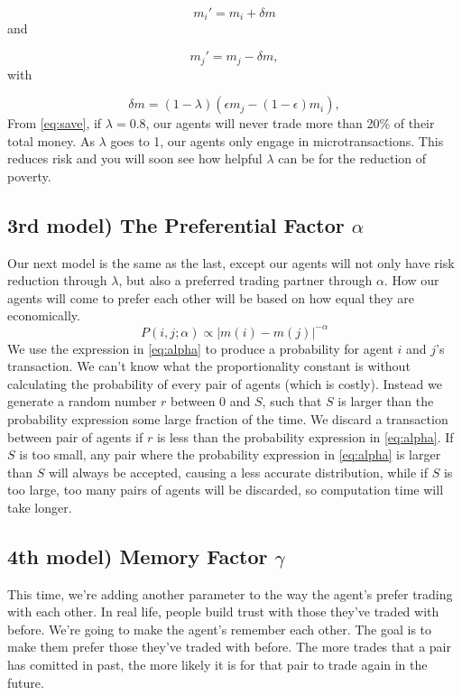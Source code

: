 \documentclass[12pt,a4paper]{article}
\begin{document}
\begin{equation}
  m_i'=m_i+\delta m
\end{equation}
and

\begin{equation}
  m_j'=m_j-\delta m,
\end{equation}
with

\begin{equation}\label{eq:save}
  \delta m=(1-\lambda)(\epsilon m_j-(1-\epsilon)m_i),
\end{equation}
From \eqref{eq:save}, if $\lambda = 0.8$, our agents will never trade more than 20\% of their total money.
As $\lambda$ goes to 1, our agents only engage in microtransactions. This reduces risk and you will soon see how helpful $\lambda$ can be for the reduction of poverty.

\subsection{3rd model) The Preferential Factor $\alpha$}
Our next model is the same as the last, except our agents will not only have risk reduction through $\lambda$, but also a preferred trading partner through $\alpha$.
How our agents will come to prefer each other will be based on how equal they are economically.
\begin{equation}\label{eq:alpha}
 P(i,j;\alpha) \propto \left|m(i)-m(j) \right|^{-\alpha}
\end{equation}
We use the expression in \eqref{eq:alpha} to produce a probability for agent $i$ and $j$'s transaction. We can't know what the proportionality constant is without
calculating the probability of every pair of agents (which is costly). Instead we generate a random number $r$ between $0$ and $S$, such that $S$ is larger than the probability expression
some large fraction of the time. We discard a transaction between pair of agents if $r$ is less than the probability expression in \eqref{eq:alpha}.
If $S$ is too small, any pair where the probability expression in \eqref{eq:alpha} is larger than $S$ will always be accepted, causing a less accurate distribution, while if $S$ is too large, too
many pairs of agents will be discarded, so computation time will take longer.

\subsection{4th model) Memory Factor $\gamma$}
This time, we're adding another parameter to the way the agent's prefer trading with each other.
In real life, people build trust with those they've traded with before. We're going to make the agent's remember each other. The goal is to make them prefer those they've traded with before.
The more trades that a pair has comitted in past, the more likely it is for that pair to trade again in the future.
\end{document}
